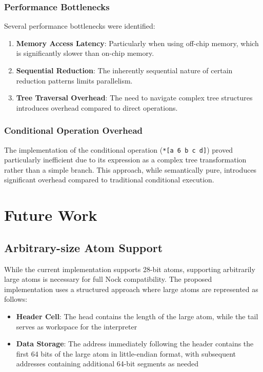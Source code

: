 \documentclass[twoside]{article}
\begin{document}
\subsubsection{Performance Bottlenecks}

Several performance bottlenecks were identified:

\begin{enumerate}
  \item \textbf{Memory Access Latency}: Particularly when using off-chip memory, which is significantly slower than on-chip memory.
  \item \textbf{Sequential Reduction}: The inherently sequential nature of certain reduction patterns limits parallelism.
  \item \textbf{Tree Traversal Overhead}: The need to navigate complex tree structures introduces overhead compared to direct operations.
\end{enumerate}

\subsubsection{Conditional Operation Overhead}

The implementation of the conditional operation (\texttt{*[a 6 b c d]}) proved particularly inefficient due to its expression as a complex tree transformation rather than a simple branch. This approach, while semantically pure, introduces significant overhead compared to traditional conditional execution.

\section{Future Work}

\subsection{Arbitrary-size Atom Support}

While the current implementation supports 28-bit atoms, supporting arbitrarily large atoms is necessary for full Nock compatibility. The proposed implementation uses a structured approach where large atoms are represented as follows:

\begin{itemize}
  \item \textbf{Header Cell}: The head contains the length of the large atom, while the tail serves as workspace for the interpreter
  \item \textbf{Data Storage}: The address immediately following the header contains the first 64 bits of the large atom in little-endian format, with subsequent addresses containing additional 64-bit segments as needed
\end{itemize}
\end{document}
